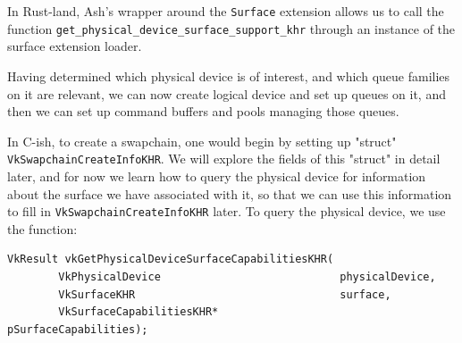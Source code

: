 \documentclass[12pt,letterpaper]{article}
\newcommand{\ril}[1]{\texttt{#1}}
\newcommand{\cil}[1]{\texttt{#1}}
\begin{document}
    In Rust-land, Ash's wrapper around the \ril{Surface} extension allows us to call the function \cil{get_physical_device_surface_support_khr} through an instance of the surface extension loader.
    
    Having determined which physical device is of interest, and which queue families on it are relevant, we can now create logical device and set up queues on it, and then we can set up command buffers and pools managing those queues. 
    
	In C-ish, to create a swapchain, one would begin by setting up "struct" \cil{VkSwapchainCreateInfoKHR}. We will explore the fields of this "struct" in detail later, and for now we learn how to query the physical device for information about the surface we have associated with it, so that we can use this information to fill in \cil{VkSwapchainCreateInfoKHR} later. To query the physical device, we use the function:
        \begin{verbatim}
VkResult vkGetPhysicalDeviceSurfaceCapabilitiesKHR(
        VkPhysicalDevice                            physicalDevice,
        VkSurfaceKHR                                surface,
        VkSurfaceCapabilitiesKHR*                   pSurfaceCapabilities);
        \end{verbatim}
        
\end{document}
